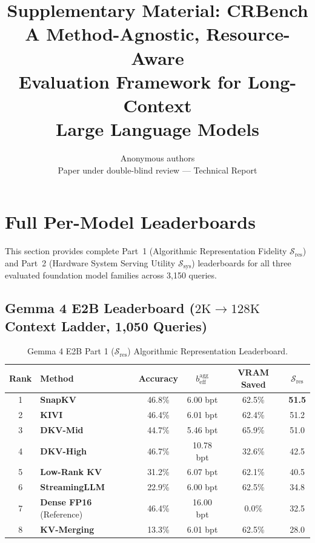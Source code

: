 \documentclass[10pt]{article}
\title{Supplementary Material: CRBench \\ \large A Method-Agnostic, Resource-Aware \\ Evaluation Framework for Long-Context \\ Large Language Models}
\author{\name Anonymous authors \\
        \addr Paper under double-blind review --- Technical Report}
\theoremstyle{definition}
\begin{document}
\maketitle

\appendix

\section{Full Per-Model Leaderboards}
\label{sec:app_leaderboards}

This section provides complete Part~1 (Algorithmic Representation Fidelity $\mathcal{S}_{\text{res}}$) and Part~2 (Hardware System Serving Utility $\mathcal{S}_{\text{sys}}$) leaderboards for all three evaluated foundation model families across 3,150 queries.

\subsection{Gemma 4 E2B Leaderboard (\texorpdfstring{$2\text{K} \to 128\text{K}$}{2K to 128K} Context Ladder, 1,050 Queries)}

\begin{table}[h]
\vspace{6pt}
\centering
\small
\caption{Gemma 4 E2B Part 1 ($\mathcal{S}_{\text{res}}$) Algorithmic Representation Leaderboard.}
\label{tab:e2b_sres}
\begin{tabular}{clcccc}
\toprule
\textbf{Rank} & \textbf{Method} & \textbf{Accuracy} & $b_{\text{eff}}^{\text{agg}}$ & \textbf{VRAM Saved} & $\mathcal{S}_{\text{res}}$ \\
\midrule
1 & \textbf{SnapKV} & 46.8\% & 6.00 bpt & 62.5\% & \textbf{51.5} \\
2 & \textbf{KIVI} & 46.4\% & 6.01 bpt & 62.4\% & 51.2 \\
3 & \textbf{DKV-Mid} & 44.7\% & 5.46 bpt & 65.9\% & 51.0 \\
4 & \textbf{DKV-High} & 46.7\% & 10.78 bpt & 32.6\% & 42.5 \\
5 & \textbf{Low-Rank KV} & 31.2\% & 6.07 bpt & 62.1\% & 40.5 \\
6 & \textbf{StreamingLLM} & 22.9\% & 6.00 bpt & 62.5\% & 34.8 \\
7 & \textbf{Dense FP16} (Reference) & 46.4\% & 16.00 bpt & 0.0\% & 32.5 \\
8 & \textbf{KV-Merging} & 13.3\% & 6.01 bpt & 62.5\% & 28.0 \\
\bottomrule
\end{tabular}
\end{table}
\end{document}
